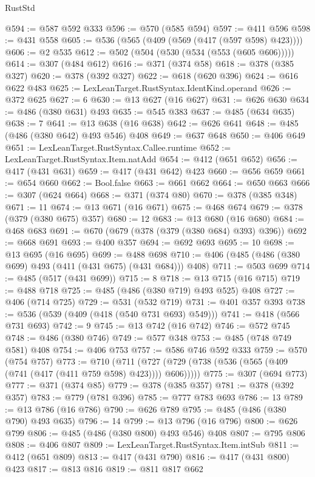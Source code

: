 \begin{lexlean}{RustStd}
\begin{coremodule}
{\begin{coremodule}
{{{{{{{{{{{@594 := @587 @592 @333
@596 := @570 (@585 @594)
@597 := @411 @596
@598 := @431 @558
@605 := @536 (@565 (@409 (@569 (@417 (@597 @598) @423))))
@606 := @2 @535
@612 := @502 (@504 (@530 (@534 (@553 (@605 @606)))))
@614 := @307 (@484 @612)
@616 := @371 (@374 @58)
@618 := @378 (@385 @327)
@620 := @378 (@392 @327)
@622 := @618 (@620 @396)
@624 := @616 @622 @483
@625 := LexLeanTarget.RustSyntax.IdentKind.operand
@626 := @372 @625
@627 := 6
@630 := @13 @627 (@16 @627)
@631 := @626 @630
@634 := @486 (@380 @631) @493
@635 := @545 @383
@637 := @485 (@634 @635)
@638 := 7
@641 := @13 @638 (@16 @638)
@642 := @626 @641
@648 := @485 (@486 (@380 @642) @493 @546) @408
@649 := @637 @648
@650 := @406 @649
@651 := LexLeanTarget.RustSyntax.Callee.runtime
@652 := LexLeanTarget.RustSyntax.Item.natAdd
@654 := @412 (@651 @652)
@656 := @417 (@431 @631)
@659 := @417 (@431 @642) @423
@660 := @656 @659
@661 := @654 @660
@662 := Bool.false
@663 := @661 @662
@664 := @650 @663
@666 := @307 (@624 @664)
@668 := @371 (@374 @80)
@670 := @378 (@385 @348)
@671 := 11
@674 := @13 @671 (@16 @671)
@675 := @468 @674
@679 := @378 (@379 (@380 @675) @357)
@680 := 12
@683 := @13 @680 (@16 @680)
@684 := @468 @683
@691 := @670 (@679 (@378 (@379 (@380 @684) @393) @396))
@692 := @668 @691
@693 := @400 @357
@694 := @692 @693
@695 := 10
@698 := @13 @695 (@16 @695)
@699 := @488 @698
@710 := @406 (@485 (@486 (@380 @699) @493 (@411 (@431 @675) (@431 @684))) @408)
@711 := @503 @699
@714 := @485 (@517 (@431 @699))
@715 := 8
@718 := @13 @715 (@16 @715)
@719 := @488 @718
@725 := @485 (@486 (@380 @719) @493 @525) @408
@727 := @406 (@714 @725)
@729 := @531 (@532 @719)
@731 := @401 @357 @393
@738 := @536 (@539 (@409 (@418 (@540 @731 @693) @549)))
@741 := @418 (@566 @731 @693)
@742 := 9
@745 := @13 @742 (@16 @742)
@746 := @572 @745
@748 := @486 (@380 @746)
@749 := @577 @348
@753 := @485 (@748 @749 @581) @408
@754 := @406 @753
@757 := @586 @746 @592 @333
@759 := @570 (@754 @757)
@773 := @710
    (@711 (@727 (@729 (@738 (@536 (@565 (@409 (@741 (@417 (@411 @759 @598) @423)))) @606)))))
@775 := @307 (@694 @773)
@777 := @371 (@374 @85)
@779 := @378 (@385 @357)
@781 := @378 (@392 @357)
@783 := @779 (@781 @396)
@785 := @777 @783 @693
@786 := 13
@789 := @13 @786 (@16 @786)
@790 := @626 @789
@795 := @485 (@486 (@380 @790) @493 @635)
@796 := 14
@799 := @13 @796 (@16 @796)
@800 := @626 @799
@806 := @485 (@486 (@380 @800) @493 @546) @408
@807 := @795 @806
@808 := @406 @807
@809 := LexLeanTarget.RustSyntax.Item.intSub
@811 := @412 (@651 @809)
@813 := @417 (@431 @790)
@816 := @417 (@431 @800) @423
@817 := @813 @816
@819 := @811 @817 @662
}}}}}}}}}}}
\end{coremodule}}
\end{coremodule}
\end{lexlean}
